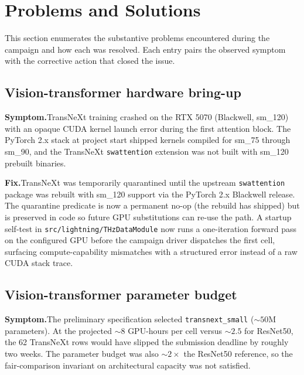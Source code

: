 \section{Problems and Solutions}
\label{sec:problems}

This section enumerates the substantive problems encountered during the
campaign and how each was resolved. Each entry pairs the observed symptom
with the corrective action that closed the issue.

\subsection{Vision-transformer hardware bring-up}
\textbf{Symptom.}\quad TransNeXt training crashed on the RTX 5070 (Blackwell,
sm\_120) with an opaque CUDA kernel launch error during the first
attention block. The PyTorch 2.x stack at project start shipped kernels
compiled for sm\_75 through sm\_90, and the TransNeXt
\texttt{swattention} extension was not built with sm\_120 prebuilt
binaries.

\textbf{Fix.}\quad TransNeXt was temporarily quarantined until the
upstream \texttt{swattention} package was rebuilt with sm\_120 support
via the PyTorch 2.x Blackwell release. The quarantine predicate is now a
permanent no-op (the rebuild has shipped) but is preserved in code so
future GPU substitutions can re-use the path. A startup self-test in
\texttt{src/lightning/THzDataModule} now runs a one-iteration forward
pass on the configured GPU before the campaign driver dispatches the
first cell, surfacing compute-capability mismatches with a structured
error instead of a raw CUDA stack trace.

\subsection{Vision-transformer parameter budget}
\textbf{Symptom.}\quad The preliminary specification selected
\texttt{transnext\_small} ($\sim 50$M parameters). At the projected
$\sim 8$ GPU-hours per cell versus $\sim 2.5$ for ResNet50, the 62
TransNeXt rows would have slipped the submission deadline by roughly two
weeks. The parameter budget was also $\sim 2\times$ the ResNet50
reference, so the fair-comparison invariant on architectural capacity
was not satisfied.

